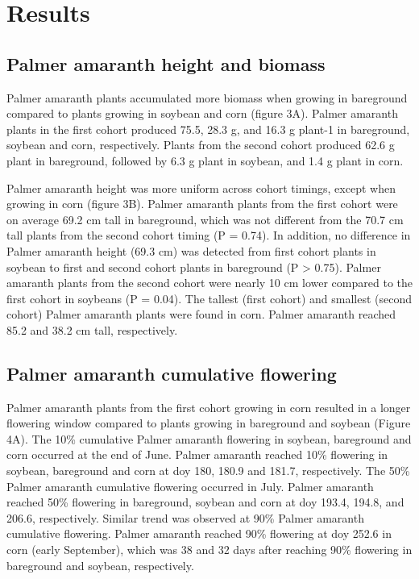 \documentclass[utf8]{frontiersSCNS}
\begin{document}
\hypertarget{results}{%
\section*{Results}\label{results}}

\hypertarget{palmer-amaranth-height-and-biomass}{%
\subsection*{Palmer amaranth height and
biomass}\label{palmer-amaranth-height-and-biomass}}

Palmer amaranth plants accumulated more biomass when growing in
bareground compared to plants growing in soybean and corn (figure 3A).
Palmer amaranth plants in the first cohort produced 75.5, 28.3 g, and
16.3 g plant-1 in bareground, soybean and corn, respectively. Plants
from the second cohort produced 62.6 g plant in bareground, followed by
6.3 g plant in soybean, and 1.4 g plant in corn.

Palmer amaranth height was more uniform across cohort timings, except
when growing in corn (figure 3B). Palmer amaranth plants from the first
cohort were on average 69.2 cm tall in bareground, which was not
different from the 70.7 cm tall plants from the second cohort timing (P
= 0.74). In addition, no difference in Palmer amaranth height (69.3 cm)
was detected from first cohort plants in soybean to first and second
cohort plants in bareground (P \textgreater{} 0.75). Palmer amaranth
plants from the second cohort were nearly 10 cm lower compared to the
first cohort in soybeans (P = 0.04). The tallest (first cohort) and
smallest (second cohort) Palmer amaranth plants were found in corn.
Palmer amaranth reached 85.2 and 38.2 cm tall, respectively.

\hypertarget{palmer-amaranth-cumulative-flowering}{%
\subsection*{Palmer amaranth cumulative
flowering}\label{palmer-amaranth-cumulative-flowering}}

Palmer amaranth plants from the first cohort growing in corn resulted in
a longer flowering window compared to plants growing in bareground and
soybean (Figure 4A). The 10\% cumulative Palmer amaranth flowering in
soybean, bareground and corn occurred at the end of June. Palmer
amaranth reached 10\% flowering in soybean, bareground and corn at doy
180, 180.9 and 181.7, respectively. The 50\% Palmer amaranth cumulative
flowering occurred in July. Palmer amaranth reached 50\% flowering in
bareground, soybean and corn at doy 193.4, 194.8, and 206.6,
respectively. Similar trend was observed at 90\% Palmer amaranth
cumulative flowering. Palmer amaranth reached 90\% flowering at doy
252.6 in corn (early September), which was 38 and 32 days after reaching
90\% flowering in bareground and soybean, respectively.
\end{document}
